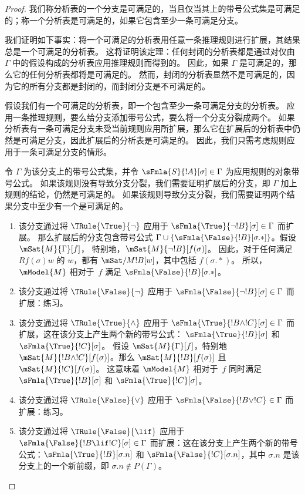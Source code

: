 \documentclass[../../../include/open-logic-section]{subfiles}
\begin{document}
\begin{proof}
我们称分析表的一个分支是可满足的，当且仅当其上的带号公式集是可满足的；称一个分析表是可满足的，如果它包含至少一条可满足分支。

我们证明如下事实：将一个可满足的分析表用任意一条推理规则进行扩展，其结果总是一个可满足的分析表。
这将证明该定理：任何封闭的分析表都是通过对仅由~$\Gamma$ 中的假设构成的分析表应用推理规则而得到的。
因此，如果 $\Gamma$ 是可满足的，那么它的任何分析表都将是可满足的。
然而，封闭的分析表显然不是可满足的，因为它的所有分支都是封闭的，而封闭分支是不可满足的。

假设我们有一个可满足的分析表，即一个包含至少一条可满足分支的分析表。
应用一条推理规则，要么给分支添加带号公式，要么将一个分支分裂成两个。
如果分析表有一条可满足分支未受当前规则应用所扩展，那么它在扩展后的分析表中仍然是可满足分支，因此扩展后的分析表是可满足的。
因此，我们只需考虑规则应用于一条可满足分支的情形。

令 $\Gamma$ 为该分支上的带号公式集，并令 $\sFmla{S}{!A}[\sigma] \in \Gamma$ 为应用规则的对象带号公式。
如果该规则没有导致分支分裂，我们需要证明扩展后的分支，即 $\Gamma$ 加上规则的结论，仍然是可满足的。
如果该规则导致分支分裂，我们需要证明两个结果分支中至少有一个是可满足的。
\begin{enumerate}
\item 该分支通过将 $\TRule{\True}{\lnot}$ 应用于 $\sFmla{\True}{\lnot !B}[\sigma] \in \Gamma$ 而扩展。
  那么扩展后的分支包含带号公式 $\Gamma \cup
  \{\sFmla{\False}{!B}[\sigma.{*}]\}$。假设 $\mSat{M}{\Gamma}[f]$，
  特别地，$\mSat{M}{\lnot !B}[f(\sigma)]$。
  因此，对于任何满足 $Rf(\sigma)w$ 的 $w$，都有 $\mSat/{M}{!B}[w]$，其中包括 $f(\sigma.{*})$。
  所以，$\mModel{M}$ 相对于~$f$ 满足 $\sFmla{\False}{!B}[\sigma.{*}]$。
\item 该分支通过将 $\TRule{\False}{\lnot}$ 应用于 $\sFmla{\False}{\lnot !B}[\sigma] \in \Gamma$ 而扩展：练习。
\item 该分支通过将 $\TRule{\True}{\land}$ 应用于 $\sFmla{\True}{!B \land !C}[\sigma] \in \Gamma$ 而扩展，这在该分支上产生两个新的带号公式：
  $\sFmla{\True}{!B}[\sigma]$ 和 $\sFmla{\True}{!C}[\sigma]$。
  假设 $\mSat{M}{\Gamma}[f]$，特别地 $\mSat{M}{!B \land
    !C}[f(\sigma)]$。那么 $\mSat{M}{!B}[f(\sigma)]$ 且 $\mSat{M}{!C}[f(\sigma)]$。
  这意味着 $\mModel{M}$ 相对于~$f$ 同时满足 $\sFmla{\True}{!B}[\sigma]$ 和 $\sFmla{\True}{!C}[\sigma]$。
\item 该分支通过将 $\TRule{\False}{\lor}$ 应用于 $\sFmla{\False}{!B \lor !C} \in \Gamma$ 而扩展：练习。
\item 该分支通过将 $\TRule{\False}{\lif}$ 应用于 $\sFmla{\False}{!B \lif !C}[\sigma] \in \Gamma$ 而扩展：这在该分支上产生两个新的带号公式：$\sFmla{\True}{!B}[\sigma.n]$ 和 $\sFmla{\False}{!C}[\sigma.n]$，其中 $\sigma.n$ 是该分支上的一个新前缀，即 $\sigma.n \notin P(\Gamma)$。


\end{enumerate}
\end{proof}
\end{document}
